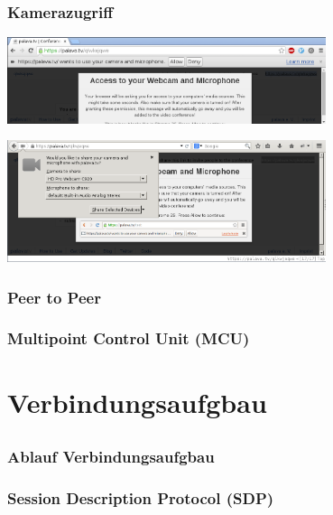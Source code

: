 \documentclass[12pt]{beamer}
\begin{document}
\begin{frame}
  \frametitle{Kamerazugriff}
  \pause
  \centerline{\includegraphics[width=0.7\textwidth]{img/access_chrome.png}}
  \vspace{15pt}
  \centerline{\includegraphics[width=0.7\textwidth]{img/access_firefox.png}}
\end{frame}

\begin{frame}
  \frametitle{Peer to Peer}
  \pause
  \centerline{}
\end{frame}

\begin{frame}
  \frametitle{Multipoint Control Unit (MCU)}
  \pause
  \centerline{}
\end{frame}


\section{Verbindungsaufgbau}
\subsection{} 

\begin{frame}
  \frametitle{Ablauf Verbindungsaufgbau}
  \centerline{}
\end{frame}

\begin{frame}
  \frametitle{Session Description Protocol (SDP)}
  \pause
  \begin{multicols}{2}
    
  \end{multicols}
\end{frame}
\end{document}
